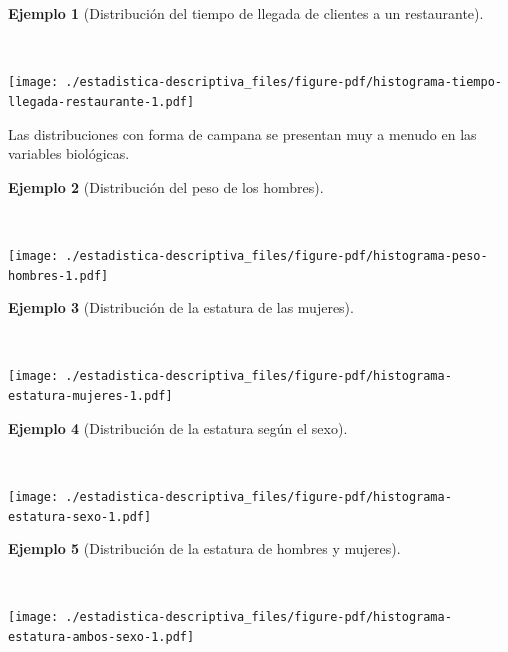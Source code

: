 \documentclass[
  a4paper,
]{scrreport}
\theoremstyle{definition}
\theoremstyle{definition}
\newtheorem{example}{Ejemplo}[chapter]
\theoremstyle{plain}
\theoremstyle{remark}
\begin{document}
\leavevmode{}%
\begin{example}[Distribución del tiempo de llegada de clientes a un
restaurante]\label{exm-distribucion-llegada-clientes-restaurantes}

~

\texttt{[image: ./estadistica-descriptiva\_files/figure-pdf/histograma-tiempo-llegada-restaurante-1.pdf]}

\end{example}

Las distribuciones con forma de campana se presentan muy a menudo en las
variables biológicas.

\leavevmode{}%
\begin{example}[Distribución del peso de los
hombres]\label{exm-distribucion-peso-hombres}

~

\texttt{[image: ./estadistica-descriptiva\_files/figure-pdf/histograma-peso-hombres-1.pdf]}

\end{example}

\leavevmode{}%
\begin{example}[Distribución de la estatura de las
mujeres]\label{exm-distribucion-estatura-mujeres}

~

\texttt{[image: ./estadistica-descriptiva\_files/figure-pdf/histograma-estatura-mujeres-1.pdf]}

\end{example}

\leavevmode{}%
\begin{example}[Distribución de la estatura según el
sexo]\label{exm-distribucion-estaturas-sexo}

~

\texttt{[image: ./estadistica-descriptiva\_files/figure-pdf/histograma-estatura-sexo-1.pdf]}

\end{example}

\leavevmode{}%
\begin{example}[Distribución de la estatura de hombres y
mujeres]\label{exm-distribucion-estaturas-ambos-sexos}

~

\texttt{[image: ./estadistica-descriptiva\_files/figure-pdf/histograma-estatura-ambos-sexo-1.pdf]}

\end{example}
\end{document}
